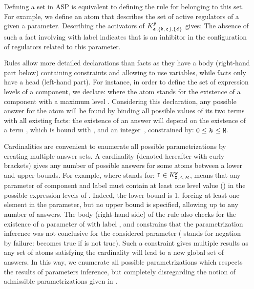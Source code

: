 Defining a set in ASP is equivalent to defining the rule for belonging to this set.
For example, we define an atom  that describes the set of active regulators of a given a parameter.
Describing the activators of $K^{\texttt{\textit{p}}}_{\texttt{\textit{a}},\{\texttt{\textit{b}},\texttt{\textit{c}}\},\{\texttt{\textit{d}}\}}$ gives:
The absence of such a fact involving  with label  indicates that  is an inhibitor in the configuration of regulators related to this parameter.

Rules allow more detailed declarations than facts as they have a body (right-hand part below) containing constraints and allowing to use variables, while facts only have a head (left-hand part).
For instance, in order to define the set of expression levels of a component, we declare:
where the  atom stands for the existence of a component  with a maximum level .
Considering this declaration, any possible answer for the atom  will be found by binding all possible values of its two terms with all existing  facts: the existence of an answer  will depend on the existence of a term , which is bound with , and an integer~, constrained by: $0 \leq \texttt{\textit{k}} \leq \texttt{M}$.

Cardinalities are convenient to enumerate all possible parametrizations by creating multiple answer sets.
A cardinality (denoted hereafter with curly brackets) gives any number of possible answers for some atoms between a lower and upper bounds.
For example,
where  stands for: $\texttt{I} \in K^{\texttt{P}}_{\texttt{X},A,B}$,
means that any parameter of component  and label  must contain at least one level value () in the possible expression levels of .
Indeed, the lower bound is 1, forcing at least one element in the parameter, but no upper bound is specified, allowing up to any number of answers.
The body (right-hand side) of the rule also checks for the existence of a parameter of  with label , and constrains that the parametrization inference was not conclusive for the considered parameter ( stands for negation by failure:  becomes true if  is not true).
Such a constraint gives multiple results as any set of  atoms satisfying the cardinality will lead to a new global set of answers.
In this way, we enumerate all possible parametrizations which respects the results of parameters
inference, but completely disregarding the notion of admissible parametrizations given in
.

